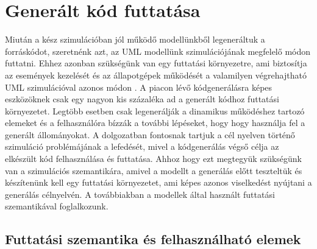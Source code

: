 \documentclass[a4paper,12pt]{report}
\begin{document}
\section{Generált kód futtatása}

Miután a kész szimulációban jól működő modellünkből legeneráltuk a forráskódot, szeretnénk azt, az UML modellünk szimulációjának megfelelő módon futtatni. Ehhez azonban szükségünk van egy futtatási környezetre, ami biztosítja az események kezelését és az állapotgépek működését a valamilyen végrehajtható UML szimulációval azonos módon \cite{EPC}.
A piacon lévő kódgenerálásra képes eszközöknek csak egy nagyon kis százaléka ad a generált kódhoz futtatási környezetet. Legtöbb esetben csak legenerálják a dinamikus működéshez tartozó elemeket és a felhasználóra bízzák a további lépéseket, hogy hogy használja fel a generált állományokat. A dolgozatban fontosnak tartjuk a cél nyelven történő szimuláció problémájának a lefedését, mivel a kódgenerálás végső célja az elkészült kód felhasználása és futtatása.
Ahhoz hogy ezt megtegyük szükségünk van a szimulációs szemantikára, amivel a modellt a generálás előtt teszteltük és készítenünk kell egy futtatási környezetet, ami képes azonos viselkedést nyújtani a generálás célnyelvén. A továbbiakban a modellek által használt futtatási szemantikával foglalkozunk.

\subsection{Futtatási szemantika és felhasználható elemek}%
\end{document}
